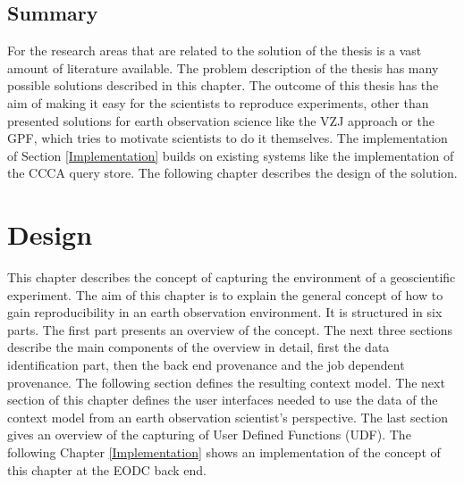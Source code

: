 \documentclass[draft,final]{vutinfth} %
\begin{document}

\section{Summary}

For the research areas that are related to the solution of the thesis is a vast amount of literature available. The problem description of the thesis has many possible solutions described in this chapter. The outcome of this thesis has the aim of making it easy for the scientists to reproduce experiments, other than presented solutions for earth observation science like the VZJ approach or the GPF, which tries to motivate scientists to do it themselves. The implementation of Section \ref{Implementation} builds on existing systems like the implementation of the CCCA query store. The following chapter describes the design of the solution. 




 
\chapter{Design}\label{Design}
This chapter describes the concept of capturing the environment of a geoscientific experiment. The aim of this chapter is to explain the general concept of how to gain reproducibility in an earth observation environment. It is structured in six parts. The first part presents an overview of the concept. The next three sections describe the main components of the overview in detail, first the data identification part, then the back end provenance and the job dependent provenance. The following section defines the resulting context model. The next section of this chapter defines the user interfaces needed to use the data of the context model from an earth observation scientist's perspective. The last section gives an overview of the capturing of User Defined Functions (UDF). The following Chapter \ref{Implementation} shows an implementation of the concept of this chapter at the EODC back end. 
\end{document}
